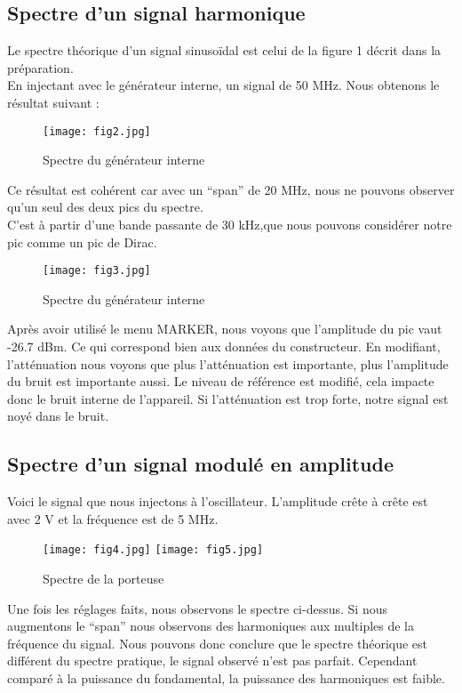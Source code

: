 \documentclass[oneside,a4paper,12pt]{article}
\begin{document}
	\subsection{Spectre d'un signal harmonique}
	
	Le spectre théorique d’un signal sinusoïdal est celui de la figure 1 décrit dans la préparation.\\
	En injectant avec le générateur interne, un signal de 50 MHz. Nous obtenons le résultat suivant :
	
	\begin{figure}[h]
		\centering
		\texttt{[image: fig2.jpg]}
		\caption{Spectre du générateur interne}
	\end{figure}
	
	Ce résultat est cohérent car avec un “span” de 20 MHz, nous ne pouvons observer qu’un seul des deux pics du spectre.\\
	C’est à partir d’une bande passante de 30 kHz,que nous pouvons considérer notre pic comme un pic de Dirac. \\
	
	\begin{figure}[h]
		\centering
		\texttt{[image: fig3.jpg]}
		\caption{Spectre du générateur interne}
	\end{figure}
	
	Après avoir utilisé le menu MARKER, nous voyons que l’amplitude du pic vaut -26.7 dBm. Ce qui correspond bien aux données du constructeur. En modifiant, l'atténuation nous voyons que plus l’atténuation est importante, plus l’amplitude du bruit est importante aussi. Le niveau de référence est modifié, cela impacte donc le bruit interne de l’appareil. Si l'atténuation est trop forte, notre signal est noyé dans le bruit.
	
	\subsection{Spectre d'un signal modulé en amplitude}
	
	Voici le signal que nous injectons à l'oscillateur. L’amplitude crête à crête est avec 2 V et la fréquence est de 5 MHz.
	
	\begin{figure}[h]
		\centering
		\texttt{[image: fig4.jpg]}
		\texttt{[image: fig5.jpg]}
		\caption{Spectre de la porteuse}
	\end{figure}
	
	Une fois les réglages faits, nous observons le spectre ci-dessus. Si nous augmentons le “span” nous observons des harmoniques aux multiples de la fréquence du signal. Nous pouvons donc conclure que le spectre théorique est différent du spectre pratique, le signal observé n’est pas parfait. Cependant comparé à la puissance du fondamental, la puissance des harmoniques est faible. 
	
\end{document}
